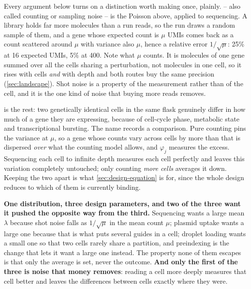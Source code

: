 Every argument below turns on a distinction worth making once, plainly.
 -- also called counting or sampling noise -- is the Poisson
above, applied to sequencing. A library holds far more molecules than a run
reads, so the run draws a random sample of them, and a gene whose expected count
is $\mu$ UMIs comes back as a count scattered around $\mu$ with variance also
$\mu$, hence a relative error $1/\sqrt{\mu}$: 25\% at 16 expected UMIs, 5\% at
400. Note what $\mu$ counts. It is molecules of one gene summed over all the
cells sharing a perturbation, not molecules in one cell, so it rises with cells
\emph{and} with depth and both routes buy the same precision
(\cref{sec:landscape}). Shot noise is a property of the measurement rather than
of the cell, and it is the one kind of noise that buying more reads removes.

 is the rest: two genetically identical cells in
the same flask genuinely differ in how much of a gene they are expressing,
because of cell-cycle phase, metabolic state and transcriptional bursting. The
name records a comparison. Pure counting pins the variance at $\mu$, so a gene
whose counts vary across cells by more than that is dispersed \emph{over} what
the counting model allows, and $\varphi_j$ measures the excess. Sequencing each
cell to infinite depth measures each cell perfectly and leaves this variation
completely untouched; only counting \emph{more cells} averages it down. Keeping
the two apart is what \cref{sec:design-equation} is for, since the whole design
reduces to which of them is currently binding.

\begin{keybox}
\textbf{One distribution, three design parameters, and two of the three want it
pushed the opposite way from the third.} Sequencing wants a large mean $\lambda$
because shot noise falls as $1/\sqrt{\mu}$ in the mean count $\mu$; plasmid
uptake wants a large one
because that is what puts several guides in a cell; droplet loading wants a small
one so that two cells rarely share a partition, and preindexing is the change
that lets it want a large one instead. The property none of them escapes is that
only the average is set, never the outcome. \textbf{And only the first of the
three is noise that money removes}: reading a cell more deeply measures that cell
better and leaves the differences between cells exactly where they were.
\end{keybox}

